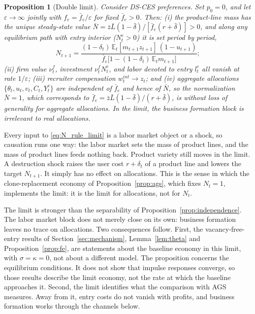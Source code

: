 \documentclass[authoryear, review, 12pt]{elsarticle}
\newtheorem{proposition}{Proposition}
\begin{document}
\begin{proposition}[Double limit]
	\label{prop:double_limit}
	Consider DS-CES preferences. Set $p_0=0$, and let 
	$\varepsilon\to\infty$ jointly with $f_e=\bar{f}_e/
	\varepsilon$ for fixed $\bar{f}_e>0$. Then: \emph{(i)} the product-line mass has the unique
	steady-state value
	$\bar{N}=\bar{z}\bar{L}(1-\bar\delta)/[\bar{f}_e(r+\bar\delta)]>0$, and along any
	equilibrium path with entry interior ($N^e_t>0$) it is set period by period,
	\begin{equation}\label{eq:N_rule_limit}
		N_{t+1}=\frac{(1-\delta_t)\,\mathbb{E}_t[m_{t+1}z_{t+1}]\,(1-u_{t+1})}
		{\bar{f}_e\bigl[1-(1-\delta_t)\,\mathbb{E}_t m_{t+1}\bigr]};
	\end{equation}
	\emph{(ii)} firm
	value $\nu_t^f$, investment $\nu_t^f N_t^e$, and 
	labor devoted to entry $l_t^e$ all vanish at rate 
	$1/\varepsilon$; \emph{(iii)} recruiter compensation 
	$w_t^{int}\to z_t$; and \emph{(iv)} aggregate 
	allocations $\{\theta_t, u_t, v_t, C_t, Y_t^c\}$ 
	are independent of $\bar{f}_e$ and hence of $\bar{N}$, so the normalization
	$\bar{N}=1$, which corresponds to $\bar{f}_e=\bar{z}\bar{L}(1-\bar\delta)/(r+\bar\delta)$, is without loss of generality for
	aggregate allocations. In the limit, the business
	formation block is irrelevant to real allocations.
\end{proposition}

Every input to \eqref{eq:N_rule_limit} is a labor market object or a shock, so causation
runs one way: the labor market sets the mass of product lines, and the mass of product
lines feeds nothing back. Product variety still moves in the limit. A destruction shock
raises the user cost $r+\delta_t$ of a product line and lowers the target $N_{t+1}$. It
simply has no effect on allocations. This is the sense in which the clone-replacement
economy of Proposition~\ref{prop:ags}, which fixes $N_t=1$, implements the limit: it is the
limit for allocations, not for $N_t$.

The limit is stronger than the separability of Proposition~\ref{prop:independence}. The
labor market block does not merely close on its own: business formation leaves no trace
on allocations. Two consequences follow. First, the vacancy-free-entry results of
Section~\ref{sec:mechanism}, Lemma~\ref{lem:theta} and Proposition~\ref{prop:fe}, are
statements about the baseline economy in this limit, with $\sigma=\kappa=0$, not about a
different model. The proposition concerns the equilibrium conditions. It does not show
that impulse responses converge, so those results describe the limit economy, not the rate
at which the baseline approaches it. Second, the limit identifies what the comparison with
AGS measures. Away from it, entry costs do not vanish with profits, and business formation
works through the channels below.
\end{document}
